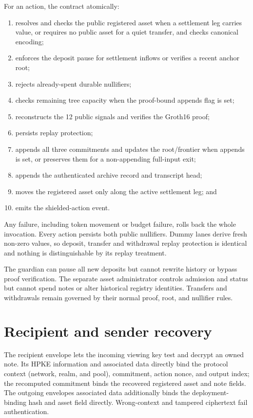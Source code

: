 \documentclass[11pt,letterpaper]{article}
\providecommand{\tightlist}{\setlength{\itemsep}{0pt}\setlength{\parskip}{0pt}}
\begin{document}
For an action, the contract atomically:

\begin{enumerate}
\def\labelenumi{\arabic{enumi}.}
\tightlist
\item
  resolves and checks the public registered asset when a settlement leg
  carries value, or requires no public asset for a quiet transfer, and
  checks canonical encoding;
\item
  enforces the deposit pause for settlement inflows or verifies a recent
  anchor root;
\item
  rejects already-spent durable nullifiers;
\item
  checks remaining tree capacity when the proof-bound appends flag is
  set;
\item
  reconstructs the 12 public signals and verifies the Groth16 proof;
\item
  persists replay protection;
\item
  appends all three commitments and updates the
  root/\allowbreak{}frontier when appends is set, or preserves them for
  a non-appending full-input exit;
\item
  appends the authenticated archive record and transcript head;
\item
  moves the registered asset only along the active settlement leg; and
\item
  emits the shielded-action event.
\end{enumerate}

Any failure, including token movement or budget failure, rolls back the
whole invocation. Every action persists both public nullifiers. Dummy
lanes derive fresh non-zero values, so deposit, transfer and withdrawal
replay protection is identical and nothing is distinguishable by its
replay treatment.

The guardian can pause all new deposits but cannot rewrite history or
bypass proof verification. The separate asset administrator controls
admission and status but cannot spend notes or alter historical registry
identities. Transfers and withdrawals remain governed by their normal
proof, root, and nullifier rules.

\section{Recipient and sender
recovery}\label{recipient-and-sender-recovery}

The recipient envelope lets the incoming viewing key test and decrypt an
owned note. Its HPKE information and associated data directly bind the
protocol context (network, realm, and pool), commitment, action nonce,
and output index; the recomputed commitment binds the recovered
registered asset and note fields. The outgoing
envelope\textquotesingle s associated data additionally binds the
deployment-binding hash and asset field directly. Wrong-context and
tampered ciphertext fail authentication.
\end{document}
